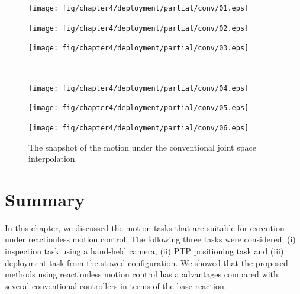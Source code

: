 \begin{figure}[t]
  \centering
  \begin{minipage}[h]{0.32\linewidth}
    \texttt{[image: fig/chapter4/deployment/partial/conv/01.eps]}
      \centering
  \end{minipage}
  \begin{minipage}[h]{0.32\linewidth}
    \texttt{[image: fig/chapter4/deployment/partial/conv/02.eps]}
    \centering
  \end{minipage}
  \begin{minipage}[h]{0.32\linewidth}
    \texttt{[image: fig/chapter4/deployment/partial/conv/03.eps]}
    \centering
  \end{minipage}\\
  \vspace{1em}
  \begin{minipage}[h]{0.32\linewidth}
    \texttt{[image: fig/chapter4/deployment/partial/conv/04.eps]}
    \centering
  \end{minipage}
  \begin{minipage}[h]{0.32\linewidth}
    \texttt{[image: fig/chapter4/deployment/partial/conv/05.eps]}
    \centering
  \end{minipage}
  \begin{minipage}[h]{0.32\linewidth}
      \texttt{[image: fig/chapter4/deployment/partial/conv/06.eps]}
      \centering
    \end{minipage}
  \caption{The snapshot of the motion under the conventional joint space interpolation.}
  \label{fig:SNAP_DEPLOY_CONP}
\end{figure}
%


\section{Summary}
In this chapter,
we discussed the motion tasks that are suitable
for execution under reactionless motion control.
The following three tasks were considered:
(i) inspection task using a hand-held camera,
(ii) PTP positioning task and
(iii) deployment task from the stowed configuration.
We showed that the proposed methods using reactionless motion control
has a advantages compared with several conventional controllers in terms of
the base reaction.











%
%
